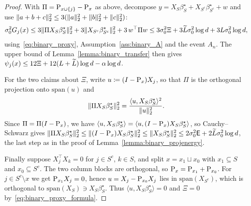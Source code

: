 \documentclass[aos]{imsart}%
\DeclarePairedDelimiter{\norm}{\lVert}{\rVert}
\theoremstyle{plain}
\theoremstyle{definition}
\begin{document}
    \begin{proof}
        With $\Pi=\mathrm{P}_{x\cup\{j\}}-\mathrm{P}_x$ as above, decompose
        $y=X_S\beta^\star_S+X_{S^{c}}\beta^\star_{S^{c}}+w$ and use
        $\norm{a+b+c}_2^{2}\leq3(\norm a_2^{2}+\norm b_2^{2}+\norm c_2^{2})$:
        \begin{equation*}
            \sigma_0^{2}G_j(x)\leq
            3\norm{\Pi X_S\beta^\star_S}_2^{2}
            +3\norm{X_{S^{c}}\beta^\star_{S^{c}}}_2^{2}
            +3\,w^{\top}\Pi w
            \leq3\sigma_0^{2}\Xi+3\Ltil\sigma_0^{2}\log d
            +3L\sigma_0^{2}\log d,
        \end{equation*}
        using~\eqref{eq:binary_proxy}, Assumption~\ref{ass:binary_A} and the
        event $A_n$. The upper bound of Lemma~\ref{lemma:binary_transfer} then
        gives $\psi_j(x)\leq12\Xi+12(L+\widetilde{L})\log d-\alpha\log d$.

        For the two claims about $\Xi$, write $u\coloneq(I-\mathrm{P}_x)X_j$, so
        that $\Pi$ is the orthogonal projection onto $\mathrm{span}(u)$ and
        \begin{equation}
            \label{eq:binary_proxy_formula}
            \norm{\Pi X_S\beta^\star_S}_2^{2}
            =\frac{\langle u,X_S\beta^\star_S\rangle^{2}}{\norm u_2^{2}} .
        \end{equation}
        Since $\Pi=\Pi(I-\mathrm{P}_x)$, we have $\langle
        u,X_S\beta^\star_S\rangle=\langle u,(I-\mathrm{P}_x)X_S\beta^\star_S\rangle$,
        so Cauchy--Schwarz gives $\norm{\Pi X_S\beta^\star_S}_2^{2}
        \leq\norm{(I-\Proj_x)X_S\beta^\star_S}_2^{2}
        \leq\norm{X_S\beta^\star_S}_2^{2}\leq2\sigma_0^{2}\Energy
        +2\Ltil\sigma_0^{2}\log d$, the last step as in the proof of
        Lemma~\ref{lemma:binary_projenergy}.

        Finally suppose $X_j^{\top}X_k=0$ for $j\in S^{c}$, $k\in S$, and split
        $x=x_1\sqcup x_0$ with $x_1\subseteq S$ and $x_0\subseteq S^{c}$. The
        two column blocks are orthogonal, so
        $\mathrm{P}_x=\mathrm{P}_{x_1}+\mathrm{P}_{x_0}$. For $j\in S^{c}\setminus x$ we get
        $\mathrm{P}_{x_1}X_j=0$, hence $u=X_j-\mathrm{P}_{x_0}X_j$ lies in
        $\mathrm{span}(X_{S^{c}})$, which is orthogonal to
        $\mathrm{span}(X_S)\ni X_S\beta^\star_S$. Thus $\langle
        u,X_S\beta^\star_S\rangle=0$ and $\Xi=0$
        by~\eqref{eq:binary_proxy_formula}.
    \end{proof}
\end{document}
